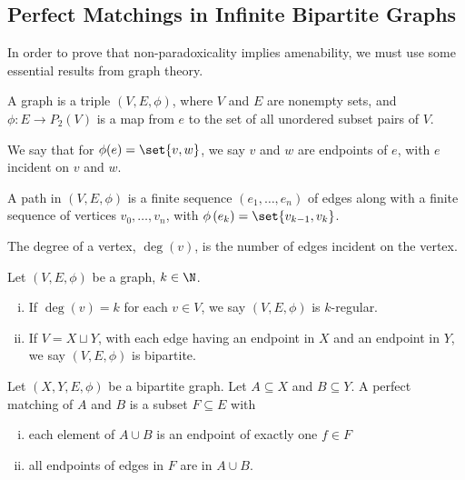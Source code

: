 \documentclass[10pt]{mypackage}
\begin{document}
\subsection{Perfect Matchings in Infinite Bipartite Graphs}%
In order to prove that non-paradoxicality implies amenability, we must use some essential results from graph theory.
\begin{definition}
  A graph is a triple $\left(V,E,\phi\right)$, where $V$ and $E$ are nonempty sets, and $\phi: E\rightarrow P_{2}(V)$ is a map from $e$ to the set of all unordered subset pairs of $V$.\newline

  We say that for $\phi(e) = \set{v,w}$, we say $v$ and $w$ are endpoints of $e$, with $e$ incident on $v$ and $w$.\newline

  A path in $(V,E,\phi)$ is a finite sequence $\left(e_1,\dots,e_n\right)$ of edges along with a finite sequence of vertices $v_0,\dots,v_n$, with $\phi\left(e_k\right) = \set{v_{k-1},v_k}$.\newline

  The degree of a vertex, $\deg(v)$, is the number of edges incident on the vertex.
\end{definition}
\begin{definition}
  Let $(V,E,\phi)$ be a graph, $k\in \N$.
  \begin{enumerate}[(i)]
    \item If $\deg(v) = k$ for each $v\in V$, we say $(V,E,\phi)$ is $k$-regular.
    \item If $V = X\sqcup Y$, with each edge having an endpoint in $X$ and an endpoint in $Y$, we say $(V,E,\phi)$ is bipartite.
  \end{enumerate}
\end{definition}
\begin{definition}
Let $(X,Y,E,\phi)$ be a bipartite graph. Let $A\subseteq X$ and $B\subseteq Y$. A perfect matching of $A$ and $B$ is a subset $F\subseteq E$ with
\begin{enumerate}[(i)]
  \item each element of $A\cup B$ is an endpoint of exactly one $f\in F$
  \item all endpoints of edges in $F$ are in $A\cup B$.
\end{enumerate}
\end{definition}
\end{document}
